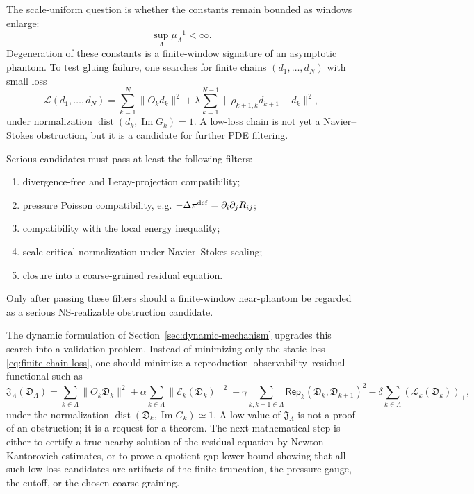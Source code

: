 \documentclass[11pt]{article}
\numberwithin{equation}{section}
\newcommand{\pos}[1]{\left(#1\right)_+}
\newcommand{\calE}{\mathcal E}
\newcommand{\calL}{\mathcal L}
\newcommand{\Rep}{\mathsf{Rep}}
\newcommand{\Image}{\operatorname{Im}}
\newcommand{\Dist}{\operatorname{dist}}
\begin{document}
The scale-uniform question is whether the constants remain bounded as windows enlarge:
\[
    \sup_\Lambda \mu_\Lambda^{-1}<\infty.
\]
Degeneration of these constants is a finite-window signature of an asymptotic phantom.  To test gluing failure, one searches for finite chains $(d_1,\ldots,d_N)$ with small loss
\begin{equation}\label{eq:finite-chain-loss}
    \mathcal L(d_1,\ldots,d_N)
    =
    \sum_{k=1}^N\|O_kd_k\|^2
    +\lambda\sum_{k=1}^{N-1}\|\rho_{k+1,k}d_{k+1}-d_k\|^2,
\end{equation}
under normalization $\Dist(d_k,\Image G_k)=1$.  A low-loss chain is not yet a Navier--Stokes obstruction, but it is a candidate for further PDE filtering.

Serious candidates must pass at least the following filters:
\begin{enumerate}[label=(\roman*),leftmargin=2em]
    \item divergence-free and Leray-projection compatibility;
    \item pressure Poisson compatibility, e.g. $-\Delta\pi^{\rm def}=\partial_i\partial_jR_{ij}$;
    \item compatibility with the local energy inequality;
    \item scale-critical normalization under Navier--Stokes scaling;
    \item closure into a coarse-grained residual equation.
\end{enumerate}
Only after passing these filters should a finite-window near-phantom be regarded as a serious NS-realizable obstruction candidate.

The dynamic formulation of Section~\ref{sec:dynamic-mechanism} upgrades this search into a validation problem.  Instead of minimizing only the static loss \eqref{eq:finite-chain-loss}, one should minimize a reproduction--observability--residual functional such as
\begin{equation}\label{eq:dynamic-search-loss}
    \mathfrak J_\Lambda(\mathfrak D_\Lambda)
    =
    \sum_{k\in\Lambda}\|O_k\mathfrak D_k\|^2
    +\alpha\sum_{k\in\Lambda}\|\calE_k(\mathfrak D_k)\|^2
    +\gamma\sum_{k,k+1\in\Lambda}\Rep_k(\mathfrak D_k,\mathfrak D_{k+1})^2
    -\delta\sum_{k\in\Lambda}\pos{\calL_k(\mathfrak D_k)},
\end{equation}
under the normalization \(\Dist(\mathfrak D_k,\Image G_k)\simeq 1\).  A low value of \(\mathfrak J_\Lambda\) is not a proof of an obstruction; it is a request for a theorem.  The next mathematical step is either to certify a true nearby solution of the residual equation by Newton--Kantorovich estimates, or to prove a quotient-gap lower bound showing that all such low-loss candidates are artifacts of the finite truncation, the pressure gauge, the cutoff, or the chosen coarse-graining.
\end{document}
